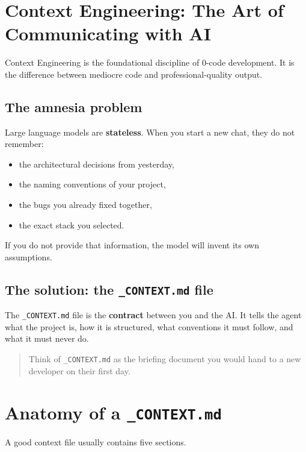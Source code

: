 \section{Context Engineering: The Art of Communicating with AI}

Context Engineering is the foundational discipline of 0-code development. It is the difference between mediocre code and professional-quality output.

\subsection{The amnesia problem}

Large language models are \textbf{stateless}. When you start a new chat, they do not remember:
\begin{itemize}
  \item the architectural decisions from yesterday,
  \item the naming conventions of your project,
  \item the bugs you already fixed together,
  \item the exact stack you selected.
\end{itemize}

If you do not provide that information, the model will invent its own assumptions.

\subsection{The solution: the \texttt{\_CONTEXT.md} file}

The \texttt{\_CONTEXT.md} file is the \textbf{contract} between you and the AI. It tells the agent what the project is, how it is structured, what conventions it must follow, and what it must never do.

\begin{quote}
Think of \texttt{\_CONTEXT.md} as the briefing document you would hand to a new developer on their first day.
\end{quote}

\section{Anatomy of a \texttt{\_CONTEXT.md}}

A good context file usually contains five sections.

